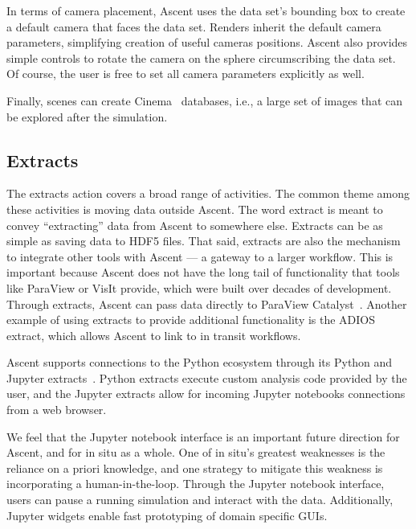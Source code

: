 In terms of camera placement,
Ascent uses the data set's bounding box to create a default camera that faces the data set.
%
Renders inherit the default camera parameters, simplifying creation of useful
cameras positions.
%
Ascent also provides simple controls to rotate the camera on the
sphere circumscribing the data set.
%
Of course, the user is free to set all
camera parameters explicitly as well.

Finally, scenes can create Cinema~\cite{AhrensCinema} databases, i.e.,
a large set of images that can be explored after the simulation.


\subsection{Extracts}
The extracts action covers a broad range of activities.
%
The common theme among these activities is moving data outside Ascent.
%
The word extract is meant to convey ``extracting'' data from Ascent to somewhere else.
%
%
%
Extracts can be as simple as saving data to HDF5 files.
%
That said, extracts are also the mechanism to integrate other tools with Ascent --- a gateway
to a larger workflow.
%
This is important because
Ascent does not have the long tail of functionality that tools like ParaView or VisIt provide, which
were built over decades of development.
%
Through extracts, Ascent can pass data directly to ParaView Catalyst~\cite{Catalyst}.
%
Another example of using extracts to provide additional functionality is the
ADIOS~\cite{Lofstead2008} extract, which allows Ascent to link to in transit workflows.

Ascent supports connections to the Python ecosystem through its Python and
Jupyter extracts~\cite{CyrusISAV,Jupyter}.
%
Python extracts execute custom analysis code provided by the user, and the
Jupyter extracts allow for incoming Jupyter notebooks connections from a web
browser.

We feel that the Jupyter notebook interface is an important future direction
for Ascent, and for in situ as a whole.
%
One of in situ's greatest weaknesses is the reliance on a priori
knowledge, and one strategy to mitigate this weakness is incorporating a human-in-the-loop.
%
Through the Jupyter notebook interface, users can pause a running simulation
and interact with the data.
%
Additionally, Jupyter widgets enable fast prototyping of domain specific GUIs.

